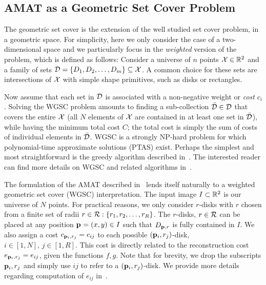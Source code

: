 \documentclass[10pt,twocolumn,letterpaper]{article}
\begin{document}
\subsection{AMAT as a Geometric Set Cover Problem}\label{sec:method:wgsc}
The geometric set cover is the extension of the well studied set cover problem, in a geometric space.
For simplicity, here we only consider the case of a two-dimensional space and we particularly focus in the 
\emph{weighted} version of the problem, which is defined as follows:
Consider a universe of $n$ points $\mathcal{X} \in \mathbb{R}^2$ and a family of sets 
$\mathcal{D} = \{D_1,D_2,\ldots,D_m\} \subseteq \mathcal{X}$. 
A common choice for these sets are intersections of $\mathcal{X}$ with simple shape primitives, such as disks or rectangles.

Now assume that each set in $\mathcal{D}$ is associated with a non-negative weight or \emph{cost} $c_i$.
Solving the WGSC problem amounts to finding a sub-collection $\bar{\mathcal{D}} \in \mathcal{D}$ that covers the entire $\mathcal{X}$
(all $N$ elements of $\mathcal{X}$ are contained in at least one set in $\bar{\mathcal{D}}$), while having the minimum
total cost $C$; the total cost is simply the sum of costs of individual elements in $\bar{\mathcal{D}}$.
WGSC is a strongly NP-hard problem for which polynomial-time approximate solutions (PTAS) exist.
Perhaps the simplest and most straightforward is the greedy algorithm described in~\cite{vazirani2013approximation}. 
The interested reader can find more details on WGSC and related algorithms 
in~\cite{mustafa2015quasi,varadarajan2010weighted,har2012weighted,chan2012weighted}.

The formulation of the AMAT described in~ lends itself naturally to a 
weighted geometric set cover (WGSC) interpretation.
The input image $I\subset\mathbb{R}^2$ is our universe of $N$ points.
For practical reasons, we only consider $r$-disks with $r$ chosen from a finite set of radii $r\in\mathcal{R}:\{r_1,r_2,\ldots,r_R\}$.
The $r$-disks, $r\in\mathcal{R}$ can be placed at any position $\mathbf{p}_{}=(x,y)\in I$ such that $D_{\mathbf{p}_{},r}$ is fully contained in $I$.
We also assign a cost $c_{\mathbf{p}_{i},r_j} = c_{ij}$ to each possible $(\mathbf{p}_{i},r_j)$-disk, $i\in[1,N],\, j\in[1,R]$.
This cost is directly related to the reconstruction cost 
$e_{\mathbf{p}_{i},r_j} = e_{ij}$, given the functions $f,g$.
Note that for brevity, we drop the subscripts $\mathbf{p}_{i},r_j$ and simply use $ij$ to refer to a $(\mathbf{p}_{i},r_j)$-disk.
We provide more details regarding computation of $e_{ij}$ in~.
\end{document}
